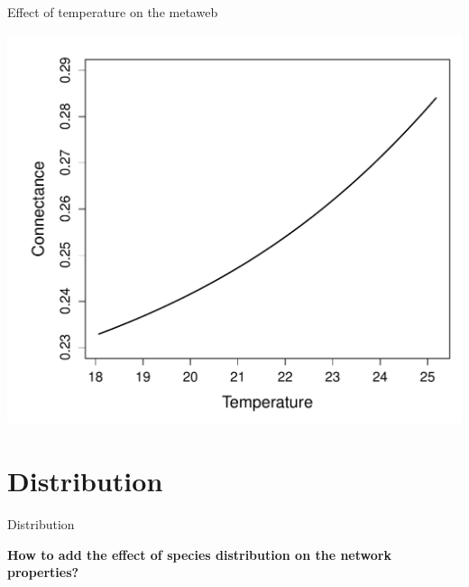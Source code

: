 \documentclass{eecslides}
\begin{document}
	\begin{frame}{Effect of temperature on the metaweb}
		\begin{center}
				\includegraphics[height=0.65\textheight]{ConnectanceTemp}\\
		\end{center}
	\end{frame}


	\section{Distribution}


	\begin{frame}{Distribution}
		\begin{center}
			\alert{\textbf{How to add the effect of species distribution on the network properties?}}
		\end{center}
	\end{frame}

\end{document}
